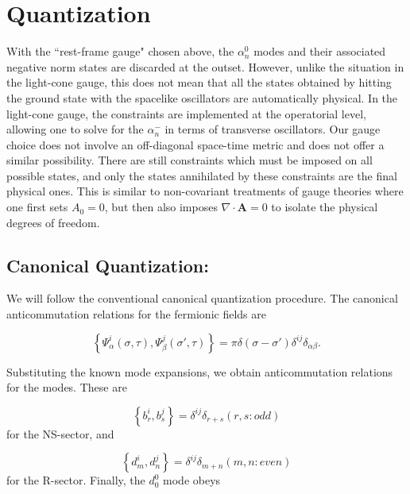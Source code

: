 \documentclass[a4paper,a4paper]{article}
\begin{document}
\section{Quantization}

With the ``rest-frame gauge" chosen above,  the $\alpha_{n}^{0}$
modes and their associated negative norm  states \cite{Gursoy} are
discarded at the outset.  However, unlike the situation in the
light-cone gauge, this does not mean that all the states obtained
by hitting the ground state with the spacelike oscillators are
automatically physical. In the light-cone gauge, the constraints
are implemented at the operatorial level, allowing one to solve
for the $\alpha^{-}_n$ in terms of transverse oscillators.  Our
gauge choice does not involve an off-diagonal space-time
metric and does not offer a similar possibility.  There are still
constraints which must be imposed on all possible states, and only
the states annihilated by these constraints are the final physical
ones. This is similar to non-covariant treatments of gauge
theories where one first sets $A_{0}=0$, but then also imposes
$\nabla \cdot \textbf{A}=0$ to isolate the physical degrees of freedom.


\subsection{Canonical Quantization:}

We will follow the conventional canonical quantization procedure.
The canonical anticommutation relations for the fermionic fields
are

\begin{equation}
\left\{\Psi_{\alpha}^{i}(\sigma, \tau), \Psi_{\beta}^{j}(\sigma',
\tau)\right\}=\pi\delta(\sigma-\sigma')\delta^{ij}\delta_{\alpha\beta}.
\end{equation}

Substituting the known mode expansions, we obtain anticommutation
relations for the modes.  These are

\begin{equation}
\left\{b_{r}^{i}, b_{s}^{j}\right\}=\delta^{ij}\delta_{r+s} (r, s:
odd )
\end{equation}
for the NS-sector, and

\begin{equation}
\left\{d_{m}^{i}, d_{n}^{j}\right\}=\delta^{ij}\delta_{m+n} (m,n:
even)
\end{equation}
for the R-sector. Finally, the $d_{0}^{0}$ mode obeys
\end{document}
